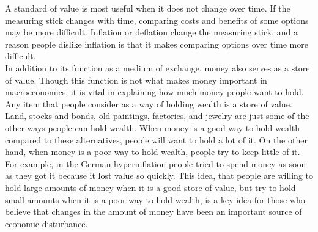 A standard of value is most useful when it does not change over time. If the measuring stick changes with time, comparing costs and benefits of some options may be more difficult. Inflation or deflation change the measuring stick, and a reason people dislike inflation is that it makes comparing options over time more difficult. \\
In addition to its function as a medium of exchange, money also serves as a store of value. Though this function is not what makes money important in macroeconomics, it is vital in explaining how much money people want to hold. Any item that people consider as a way of holding wealth is a store of value. Land, stocks and bonds, old paintings, factories, and jewelry are just some of the other ways people can hold wealth. When money is a good way to hold wealth compared to these alternatives, people will want to hold a lot of it. On the other hand, when money is a poor way to hold wealth, people try to keep little of it. For example, in the German hyperinflation people tried to spend money as soon as they got it because it lost value so quickly. This idea, that people are willing to hold large amounts of money when it is a good store of value, but try to hold small amounts when it is a poor way to hold wealth, is a key idea for those who believe that changes in the amount of money have been an important source of economic disturbance.

